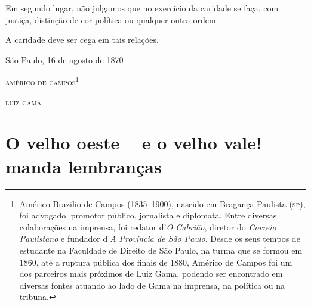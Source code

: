 {Em segundo lugar, não julgamos que no exercício da caridade se faça, com
justiça, distinção de cor política ou qualquer outra ordem.

A caridade deve ser cega em tais relações.

\begin{flushright}
São Paulo, 16 de agosto de 1870

\textsc{américo de campos}\footnote{ Américo Brazilio de Campos (1835--1900),
  nascido em Bragança Paulista (\textsc{sp}), foi advogado, promotor público,
  jornalista e diplomata. Entre diversas colaborações na imprensa, foi
  redator d'\emph{O Cabrião}, diretor do \emph{Correio Paulistano} e
  fundador d'\emph{A Província de São Paulo}. Desde os seus tempos de
  estudante na Faculdade de Direito de São Paulo, na turma que se formou
  em 1860, até a ruptura pública dos finais de 1880, Américo de Campos
  foi um dos parceiros mais próximos de Luiz Gama, podendo ser
  encontrado em diversas fontes atuando ao lado de Gama na imprensa, na
  política ou na tribuna.}

\textsc{luiz gama}
\end{flushright}

\part{O velho oeste -- e o velho vale! -- manda lembranças}

}
